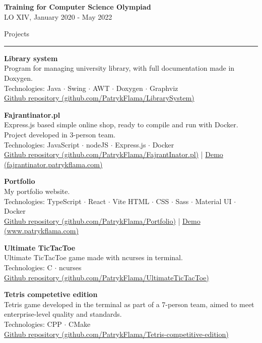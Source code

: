 \documentclass{letter}
\begin{document}
\begin{minipage}[t]{0.70\textwidth}
\begin{tcolorbox}[colback=white, colframe=white, width=\textwidth, boxrule=0pt, sharp corners, height=\textheight, left=5mm, right=5mm, top=5mm, bottom=5mm]
\textbf{Training for Computer Science Olympiad} \\
{\small  LO XIV, January 2020 - May 2022}

\vspace{\SectionSpacing}
{\large Projects}
\rule{\linewidth}{0.4pt}

{ 
\textbf{Library system} \\
Program for managing university library, with full documentation made in Doxygen. \\
{\small Technologies: Java $\cdot$ Swing $\cdot$ AWT $\cdot$ Doxygen $\cdot$ Graphviz } \\
{\small \href{https://github.com/PatrykFlama/LibrarySystem}{Github repository (github.com/PatrykFlama/LibrarySystem)}}


\textbf{Fajrantinator.pl} \\
Express.js based simple online shop, ready to compile and run with Docker. Project developed in 3-person team. \\
{\small Technologies: JavaScript $\cdot$ nodeJS $\cdot$ Express.js $\cdot$ Docker } \\
{\small \href{https://github.com/PatrykFlama/FajrantInator.pl}{Github repository (github.com/PatrykFlama/FajrantInator.pl)}} 
| {\small \href{https://fajrantinator.patrykflama.com/}{Demo (fajrantinator.patrykflama.com)}}


\textbf{Portfolio} \\
My portfolio website. \\
{\small Technologies: TypeScript $\cdot$ React $\cdot$ Vite 
HTML $\cdot$ CSS $\cdot$ Sass $\cdot$ Material UI $\cdot$ Docker } \\
{\small \href{https://github.com/PatrykFlama/Portfolio}{Github repository (github.com/PatrykFlama/Portfolio)}} 
| {\small \href{https://www.patrykflama.com/}{Demo (www.patrykflama.com)}}


\textbf{Ultimate TicTacToe} \\
Ultimate TicTacToe game made with ncurses in terminal. \\
{\small Technologies:  C $\cdot$ ncurses } \\
{\small \href{https://github.com/PatrykFlama/UltimateTicTacToe}{Github repository (github.com/PatrykFlama/UltimateTicTacToe)}} 


\textbf{Tetris competetive edition} \\
Tetris game developed in the terminal as part of a 7-person team, aimed to meet enterprise-level quality and standards. \\
{\small Technologies:  CPP $\cdot$ CMake } \\
{\small \href{https://github.com/PatrykFlama/Tetris-competitive-edition}{Github repository (github.com/PatrykFlama/Tetris-competitive-edition)}} 


}
\end{tcolorbox}
\end{minipage}
\end{document}
